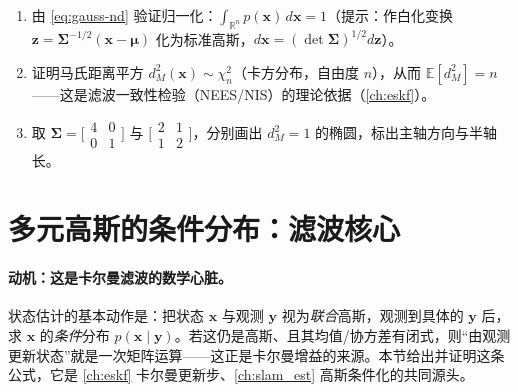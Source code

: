 \begin{practice}
\begin{enumerate}
  \item 由 \cref{eq:gauss-nd} 验证归一化：$\int_{\mathbb{R}^n}p(\mathbf{x})\,d\mathbf{x}=1$（提示：作白化变换 $\mathbf{z}=\boldsymbol{\Sigma}^{-1/2}(\mathbf{x}-\boldsymbol{\mu})$ 化为标准高斯，$d\mathbf{x}=(\det\boldsymbol{\Sigma})^{1/2}d\mathbf{z}$）。
  \item 证明马氏距离平方 $d_M^2(\mathbf{x})\sim\chi^2_n$（卡方分布，自由度 $n$），从而 $\mathbb{E}[d_M^2]=n$——这是滤波一致性检验（NEES/NIS）的理论依据（\cref{ch:eskf}）。
  \item 取 $\boldsymbol{\Sigma}=\big[\begin{smallmatrix}4&0\\0&1\end{smallmatrix}\big]$ 与 $\big[\begin{smallmatrix}2&1\\1&2\end{smallmatrix}\big]$，分别画出 $d_M^2=1$ 的椭圆，标出主轴方向与半轴长。
\end{enumerate}
\end{practice}

\section{多元高斯的条件分布：滤波核心}
\label{sec:prob-gauss-cond}

\paragraph{动机：这是卡尔曼滤波的数学心脏。}
状态估计的基本动作是：把状态 $\mathbf{x}$ 与观测 $\mathbf{y}$ 视为\emph{联合}高斯，观测到具体的 $\mathbf{y}$ 后，求 $\mathbf{x}$ 的\emph{条件}分布 $p(\mathbf{x}\mid\mathbf{y})$。若这仍是高斯、且其均值/协方差有闭式，则“由观测更新状态”就是一次矩阵运算——这正是卡尔曼增益的来源。本节给出并证明这条公式，它是 \cref{ch:eskf} 卡尔曼更新步、\cref{ch:slam_est} 高斯条件化的共同源头。

